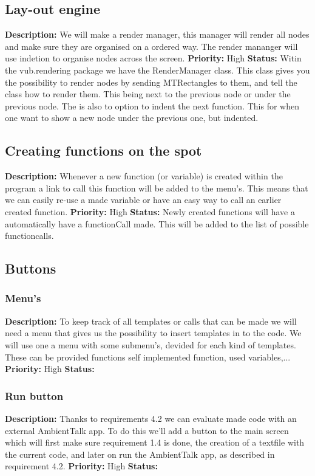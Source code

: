 \documentclass[a4paper,12pt]{report}
\begin{document}
\subsection{Lay-out engine}
\textbf{Description: } We will make a render manager, this manager will render all nodes and make sure they are organised on a ordered way. The render mananger will use
indetion to organise nodes across the screen.
\textbf{Priority:} High \newline
\textbf{Status: } Witin the vub.rendering package we have the RenderManager class. This class gives you the possibility to render nodes
by sending MTRectangles to them, and tell the class how to render them. This being next to the previous node or under the previous node. 
The is also to option to indent the next function. This for when one want to show a new node under the previous one, but indented. \newline
\subsection{Creating functions on the spot}
\textbf{Description: } Whenever a new function (or variable) is created within the program a link to call this function will be added to the menu's. This means that we can
easily re-use a made variable or have an easy way to call an earlier created function. \newline
\textbf{Priority:} High \newline
\textbf{Status: } Newly created functions will have a automatically have a functionCall made. This will be added to the list of possible
functioncalls.\newline
\subsection{Buttons}
\subsubsection{Menu's}
\textbf{Description: } To keep track of all templates or calls that can be made we will need a menu that gives us the possibility to insert templates in to the code.
We will use one a menu with some submenu's, devided for each kind of templates. These can be provided functions self implemented function, used variables,... \newline
\textbf{Priority:} High \newline
\textbf{Status: } \newline
\subsubsection{Run button}
\textbf{Description: } Thanks to requirements 4.2 we can evaluate made code with an external AmbientTalk app. To do this we'll add a button
to the main screen which will first make sure requirement 1.4 is done, the creation of a textfile with the current code, and later on run the AmbientTalk app, as described in requirement 4.2.
\textbf{Priority:} High \newline
\textbf{Status: } \newline
\end{document}
